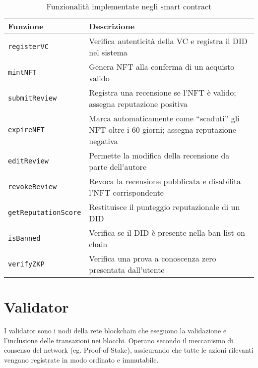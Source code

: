             \begin{table}[H]
                \centering
                \begin{tabular}{|l|p{10cm}|}
                    \hline
                    \textbf{Funzione} & \textbf{Descrizione} \\
                    \hline
                    \texttt{registerVC} & Verifica autenticità della VC e registra il DID nel sistema \\
                    \hline
                    \texttt{mintNFT} & Genera NFT alla conferma di un acquisto valido \\
                    \hline
                    \texttt{submitReview} & Registra una recensione se l'NFT è valido; assegna reputazione positiva \\
                    \hline
                    \texttt{expireNFT} & Marca automaticamente come “scaduti” gli NFT oltre i 60 giorni; assegna reputazione negativa \\
                    \hline
                    \texttt{editReview} & Permette la modifica della recensione da parte dell'autore \\
                    \hline
                    \texttt{revokeReview} & Revoca la recensione pubblicata e disabilita l'NFT corrispondente \\
                    \hline
                    \texttt{getReputationScore} & Restituisce il punteggio reputazionale di un DID \\
                    \hline
                    \texttt{isBanned} & Verifica se il DID è presente nella ban list on-chain \\
                    \hline
                    \texttt{verifyZKP} & Verifica una prova a conoscenza zero presentata dall'utente \\
                    \hline
                \end{tabular}
                \caption{Funzionalità implementate negli smart contract}
            \end{table}

    \section{Validator}
        I validator sono i nodi della rete blockchain che eseguono la validazione e l'inclusione delle transazioni nei blocchi. Operano secondo il meccanismo di consenso del network (eg. Proof-of-Stake), assicurando che tutte le azioni rilevanti vengano registrate in modo ordinato e immutabile.

